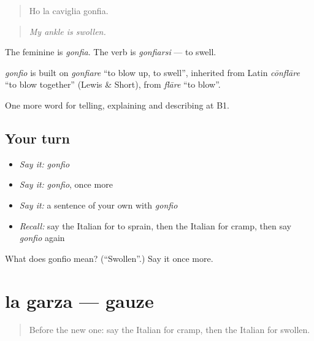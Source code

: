\begin{quote}
Ho la caviglia gonfia.
\end{quote}

\begin{quote}
\emph{My ankle is swollen.}
\end{quote}

The feminine is \emph{gonfia}. The verb is \emph{gonfiarsi} — to swell.

\begin{cousinweb}
\emph{gonfio} is built on \emph{gonfiare} \textquotedblleft{}to blow up, to swell\textquotedblright{}, inherited from Latin \emph{cōnflāre} \textquotedblleft{}to blow together\textquotedblright{} (Lewis \& Short), from \emph{flāre} \textquotedblleft{}to blow\textquotedblright{}.
\end{cousinweb}

\begin{grammarlens}[title={What you've built}]
One more word for telling, explaining and describing at B1.
\end{grammarlens}

\subsection*{Your turn}
\begin{itemize}
\raggedright
  \item \emph{Say it:} \emph{gonfio}
  \item \emph{Say it:} \emph{gonfio}, once more
  \item \emph{Say it:} a sentence of your own with \emph{gonfio}
  \item \emph{Recall:} say the Italian for to sprain, then the Italian for cramp, then say \emph{gonfio} again
\end{itemize}

\begin{tcolorbox}[breakable,colback=teal!4,colframe=teal!35!black,title={Before you move on}]
What does gonfio mean? (\textquotedblleft{}Swollen\textquotedblright{}.) Say it once more.
\end{tcolorbox}
\section[la garza]{la garza — gauze}

\label{lesson:IT-C485-garza}



\begin{quote}
Before the new one: say the Italian for cramp, then the Italian for swollen.
\end{quote}

